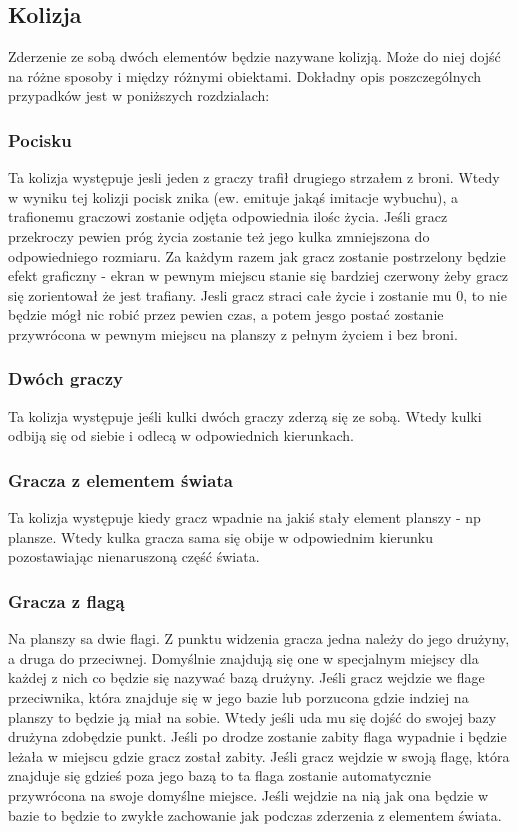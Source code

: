 \documentclass[12pt,a4paper,twoside]{article}
\begin{document}
\subsection{Kolizja}
Zderzenie ze sobą dwóch elementów będzie nazywane kolizją. Może do niej dojść na różne sposoby i między różnymi obiektami. Dokładny opis poszczególnych przypadków jest w poniższych rozdzialach:

\subsubsection{Pocisku}
Ta kolizja występuje jesli jeden z graczy trafił drugiego strzałem z broni. Wtedy w wyniku tej kolizji pocisk znika (ew. emituje jakąś imitacje wybuchu), a trafionemu graczowi zostanie odjęta odpowiednia ilośc życia. Jeśli gracz przekroczy pewien próg życia zostanie też jego kulka zmniejszona do odpowiedniego rozmiaru. Za każdym razem jak gracz zostanie postrzelony będzie efekt graficzny - ekran w pewnym miejscu stanie się bardziej czerwony żeby gracz się zorientował że jest trafiany. Jesli gracz straci całe życie i zostanie mu 0, to nie będzie mógł nic robić przez pewien czas, a potem jesgo postać zostanie przywrócona w pewnym miejscu na planszy z pełnym życiem i bez broni.

\subsubsection{Dwóch graczy}
Ta kolizja występuje jeśli kulki dwóch graczy zderzą się ze sobą. Wtedy kulki odbiją się od siebie i odlecą w odpowiednich kierunkach.

\subsubsection{Gracza z elementem świata}
Ta kolizja występuje kiedy gracz wpadnie na jakiś stały element planszy - np plansze. Wtedy kulka gracza sama się obije w odpowiednim kierunku pozostawiając nienaruszoną część świata.

\subsubsection{Gracza z flagą}
Na planszy sa dwie flagi. Z punktu widzenia gracza jedna należy do jego drużyny, a druga do przeciwnej. Domyślnie znajdują się one w specjalnym miejscy dla każdej z nich co będzie się nazywać bazą drużyny. Jeśli gracz wejdzie we flage przeciwnika, która znajduje się w jego bazie lub porzucona gdzie indziej na planszy to będzie ją miał na sobie. Wtedy jeśli uda mu się dojść do swojej bazy drużyna zdobędzie punkt. Jeśli po drodze zostanie zabity flaga wypadnie i będzie leżała w miejscu gdzie gracz został zabity. Jeśli gracz wejdzie w swoją flagę, która znajduje się gdzieś poza jego bazą to ta flaga zostanie automatycznie przywrócona na swoje domyślne miejsce. Jeśli wejdzie na nią jak ona będzie w bazie to będzie to zwykłe zachowanie jak podczas zderzenia z elementem świata.
\end{document}
